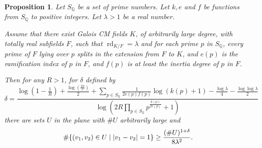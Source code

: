 \documentclass[12pt]{amsart}
\newtheorem{prop}[theo]{Proposition}
\theoremstyle{remark}
\theoremstyle{definition}
\begin{document}
\begin{prop}\label{main-sequence-criterion} Let $S_{\mathbb Q}$ be a set of prime numbers. Let $k,e$ and $f$ be functions from $S_\mathbb Q$ to positive integers. Let $\lambda>1$ be a real number.

Assume that there exist Galois CM fields $K$, of arbitrarily large degree, with totally real subfields $F$, such that  $\operatorname{rd}_{K/F}=\lambda$ and for each prime $p$ in $S_\mathbb Q$, every prime of $F$ lying over $p$ splits in the extension from $F$ to $K$, and $e(p)$ is the ramification index of $p$ in $F$, and $f(p)$ is at least the inertia degree of $p$ in $F$.

Then for any $R>1$, for $\delta$ defined by
\begin{equation}\label{delta-value} \delta=  \frac{  \log \left(1-\frac{1}{R}\right) + \frac{\log \left(\frac{2\pi}{e} \right)}{2} +\sum_{p\in S_{\mathbb Q}} \frac{1}{2e(p)f(p) } \log (k(p)+1)  - \frac{\log \lambda}{4} - \frac{\log \log \lambda}{2}}{ \log \left( 2R \prod_{p \in S_\mathbb Q} p^{\frac{k(p) }{2e(p)}} +1 \right)}\end{equation}
there are sets $U$ in the plane with $\#U$ arbitrarily large and \[ \# \{ (v_1,v_2) \in U \mid \abs{v_1-v_2}=1\} \geq  \frac{(\#U)^{1+\delta}}{8\lambda^2 } .\]


\end{prop}
\end{document}
